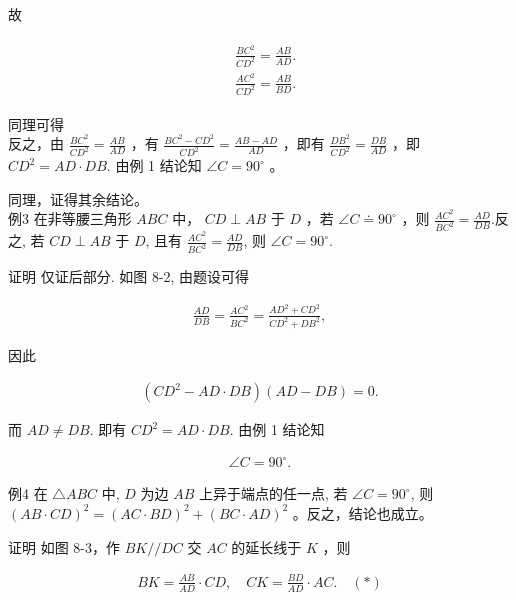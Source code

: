 \documentclass[10pt]{article}
\begin{document}
故

\begin{align*}
\begin{aligned}
& \frac{B C^{2}}{C D^{2}}=\frac{A B}{A D} . \\
& \frac{A C^{2}}{C D^{2}}=\frac{A B}{B D} .
\end{aligned}
\end{align*}

同理可得\\
反之，由 $\frac{B C^{2}}{C D^{2}}=\frac{A B}{A D}$ ，有 $\frac{B C^{2}-C D^{2}}{C D^{2}}=\frac{A B-A D}{A D}$ ，即有 $\frac{D B^{2}}{C D^{2}}=\frac{D B}{A D}$ ，即 $C D^{2}=A D \cdot D B$. 由例 1 结论知 $\angle C=90^{\circ}$ 。

同理，证得其余结论。\\
例3 在非等腰三角形 $A B C$ 中， $C D \perp A B$ 于 $D$ ，若 $\angle C \doteq 90^{\circ}$ ，则 $\frac{A C^{2}}{B C^{2}}=\frac{A D}{D B}$.反之, 若 $C D \perp A B$ 于 $D$, 且有 $\frac{A C^{2}}{B C^{2}}=\frac{A D}{D B}$, 则 $\angle C=90^{\circ}$.

证明 仅证后部分. 如图 8-2, 由题设可得

\begin{align*}
\frac{A D}{D B}=\frac{A C^{2}}{B C^{2}}=\frac{A D^{2}+C D^{2}}{C D^{2}+D B^{2}},
\end{align*}

因此

\begin{align*}
\left(C D^{2}-A D \cdot D B\right)(A D-D B)=0 .
\end{align*}

而 $A D \neq D B$. 即有 $C D^{2}=A D \cdot D B$. 由例 1 结论知

\begin{align*}
\angle C=90^{\circ} .
\end{align*}

例4 在 $\triangle A B C$ 中, $D$ 为边 $A B$ 上异于端点的任一点, 若 $\angle C=90^{\circ}$, 则 $(A B \cdot C D)^{2}=(A C \cdot B D)^{2}+(B C \cdot A D)^{2}$ 。反之，结论也成立。

证明 如图 8-3，作 $B K / / D C$ 交 $A C$ 的延长线于 $K$ ，则

\begin{align*}
B K=\frac{A B}{A D} \cdot C D, \quad C K=\frac{B D}{A D} \cdot A C . \quad(*)
\end{align*}
\end{document}
